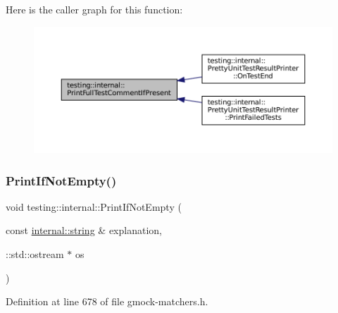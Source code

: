 Here is the caller graph for this function\+:
\nopagebreak
\begin{figure}[H]
\begin{center}
\leavevmode
\includegraphics[width=350pt]{namespacetesting_1_1internal_a7a85ebe3b4de93a1edb091f92f1fb393_icgraph}
\end{center}
\end{figure}
\mbox{\label{namespacetesting_1_1internal_afa4cd5d7933878d6d820b32c87bb2767}} 
\subsubsection{\texorpdfstring{Print\+If\+Not\+Empty()}{PrintIfNotEmpty()}}
{\footnotesize\ttfamily void testing\+::internal\+::\+Print\+If\+Not\+Empty (\begin{DoxyParamCaption}\item[{const \hyperlink{namespacetesting_1_1internal_a8e8ff5b11e64078831112677156cb111}{internal\+::string} \&}]{explanation,  }\item[{\+::std\+::ostream $\ast$}]{os }\end{DoxyParamCaption})\hspace{0.3cm}{\ttfamily [inline]}}



Definition at line 678 of file gmock-\/matchers.\+h.



